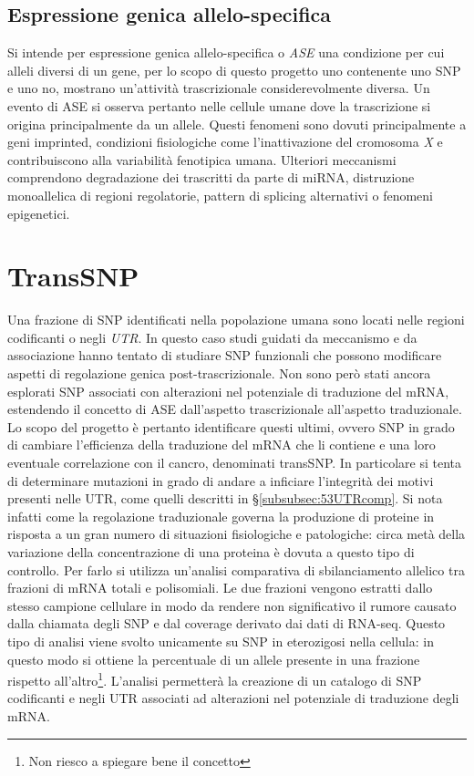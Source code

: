 \subsection{Espressione genica allelo-specifica}
Si intende per espressione genica allelo-specifica o \emph{ASE} una condizione per cui alleli diversi di un gene, per lo scopo di questo progetto uno contenente uno SNP e uno no, mostrano un'attivit\`a trascrizionale considerevolmente diversa.
Un evento di ASE si osserva pertanto nelle cellule umane dove la trascrizione si origina principalmente da un allele.
Questi fenomeni sono dovuti principalmente a geni imprinted, condizioni fisiologiche come l'inattivazione del cromosoma \emph{X} e contribuiscono alla variabilit\`a fenotipica umana.
Ulteriori meccanismi comprendono degradazione dei trascritti da parte di miRNA, distruzione monoallelica di regioni regolatorie, pattern di splicing alternativi o fenomeni epigenetici.

\section{TransSNP}
Una frazione di SNP identificati nella popolazione umana sono locati nelle regioni codificanti o negli \emph{UTR}.
In questo caso studi guidati da meccanismo e da associazione hanno tentato di studiare SNP funzionali che possono modificare aspetti di regolazione genica post-trascrizionale.
Non sono per\`o stati ancora esplorati SNP associati con alterazioni nel potenziale di traduzione del mRNA, estendendo il concetto di ASE dall'aspetto trascrizionale all'aspetto traduzionale.
Lo scopo del progetto \`e pertanto identificare questi ultimi, ovvero SNP in grado di cambiare l'efficienza della traduzione del mRNA che li contiene e una loro eventuale correlazione con il cancro, denominati transSNP.
In particolare si tenta di determinare mutazioni in grado di andare a inficiare l'integrit\`a dei motivi presenti nelle UTR, come quelli descritti in \S\ref{subsubsec:53UTRcomp}.
Si nota infatti come la regolazione traduzionale governa la produzione di proteine in risposta a un gran numero di situazioni fisiologiche e patologiche: circa met\`a della variazione della concentrazione di una proteina \`e dovuta a questo tipo di controllo.
Per farlo si utilizza un'analisi comparativa di sbilanciamento allelico tra frazioni di mRNA totali e polisomiali.
Le due frazioni vengono estratti dallo stesso campione cellulare in modo da rendere non significativo il rumore causato dalla chiamata degli SNP e dal coverage derivato dai dati di RNA-seq.
Questo tipo di analisi viene svolto unicamente su SNP in eterozigosi nella cellula: in questo modo si ottiene la percentuale di un allele presente in una frazione rispetto all'altro\footnote{Non riesco a spiegare bene il concetto}.
L'analisi permetter\`a  la creazione di un catalogo di SNP codificanti e negli UTR associati ad alterazioni nel potenziale di traduzione degli mRNA.


